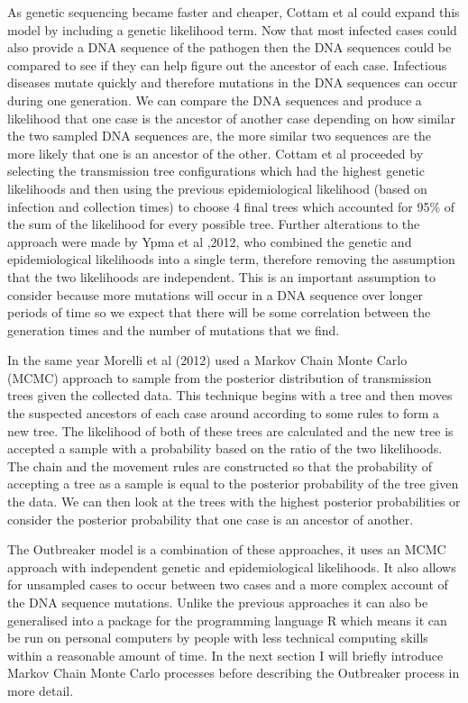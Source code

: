 \documentclass[11pt,a4paper]{report}
\begin{document}
As genetic sequencing became faster and cheaper, Cottam et al could expand this model by including a genetic likelihood term. Now that most infected cases could also provide a DNA sequence of the pathogen then the DNA sequences could be compared to see if they can help figure out the ancestor of each case. Infectious diseases mutate quickly and therefore mutations in the DNA sequences can occur during one generation. We can compare the DNA sequences and produce a likelihood that one case is the ancestor of another case depending on how similar the two sampled DNA sequences are, the more similar two sequences are the more likely that one is an ancestor of the other. Cottam et al proceeded by selecting the transmission tree configurations which had the highest genetic likelihoods and then using the previous epidemiological likelihood (based on infection and collection times) to choose 4 final trees which accounted for 95\% of the sum of the likelihood for every possible tree. Further alterations to the approach were made by Ypma et al ,2012, who combined the genetic and epidemiological likelihoods into a single term, therefore removing the assumption that the two likelihoods are independent. This is an important assumption to consider because more mutations will occur in a DNA sequence over longer periods of time so we expect that there will be some correlation between the generation times and the number of mutations that we find.

In the same year Morelli et al (2012) used a Markov Chain Monte Carlo (MCMC) approach to sample from the posterior distribution of transmission trees given the collected data. This technique begins with a tree and then moves the suspected ancestors of each case around according to some rules to form a new tree. The likelihood of both of these trees are calculated and the new tree is accepted a sample with a probability based on the ratio of the two likelihoods. The chain and the movement rules are constructed so that the probability of accepting a tree as a sample is equal to the posterior probability of the tree given the data. We can then look at the trees with the highest posterior probabilities or consider the posterior probability that one case is an ancestor of another.

The Outbreaker model is a combination of these approaches, it uses an MCMC approach with independent genetic and epidemiological likelihoods. It also allows for unsampled cases to occur between two cases and a more complex account of the DNA sequence mutations. Unlike the previous approaches it can also be generalised into a package for the programming language R which means it can be run on personal computers by people with less technical computing skills within a reasonable amount of time. In the next section I will briefly introduce Markov Chain Monte Carlo processes before describing the Outbreaker process in more detail.
\end{document}
